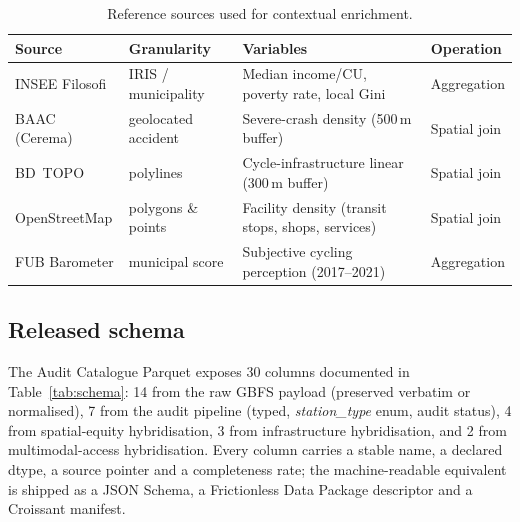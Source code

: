 \documentclass[11pt,a4paper]{article}
\begin{document}
\begin{table}[ht]
\centering
\caption{Reference sources used for contextual enrichment.}
\label{tab:sources}
\small
\begin{tabular}{@{}llll@{}}
\toprule
\textbf{Source} & \textbf{Granularity} & \textbf{Variables} &
\textbf{Operation}\\
\midrule
INSEE Filosofi & IRIS / municipality &
   Median income/CU, poverty rate, local Gini & Aggregation \\
BAAC (Cerema)  & geolocated accident &
   Severe-crash density (500\,m buffer) & Spatial join \\
BD~TOPO        & polylines &
   Cycle-infrastructure linear (300\,m buffer) & Spatial join \\
OpenStreetMap  & polygons \& points &
   Facility density (transit stops, shops, services) & Spatial join \\
FUB Barometer  & municipal score &
   Subjective cycling perception (2017--2021) & Aggregation \\
\bottomrule
\end{tabular}
\end{table}

\subsection{Released schema}\label{secSchema}
The Audit Catalogue Parquet exposes 30 columns documented in
Table~\ref{tab:schema}: 14 from the raw GBFS payload (preserved
verbatim or normalised), 7 from the audit pipeline (typed,
\emph{station\_type} enum, audit status), 4 from spatial-equity
hybridisation, 3 from infrastructure hybridisation, and 2 from
multimodal-access hybridisation. Every column carries a stable name, a
declared dtype, a source pointer and a completeness rate; the
machine-readable equivalent is shipped as a JSON Schema, a Frictionless
Data Package descriptor and a Croissant manifest.
\end{document}
